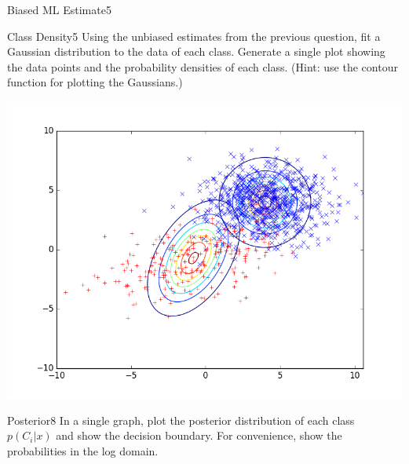 \begin{questions}
\begin{question}{Biased ML Estimate}{5}
\end{question}



\begin{question}{Class Density}{5}
Using the unbiased estimates from the previous question, fit a Gaussian distribution to the data of each class. Generate a single plot showing the data points and the probability densities of each class.
(Hint: use the contour function for plotting the Gaussians.) 

\begin{answer}
\centering \includegraphics[width=1.0\linewidth]{dataSets/2-2-d}\label{fig:gaussians}
\end{answer}

\end{question}


\begin{question}{Posterior}{8}
In a single graph, plot the posterior distribution of each class $p(C_i|x)$ 
and show the decision boundary. For convenience, show the probabilities
in the log domain.


\end{question}
\end{questions}
